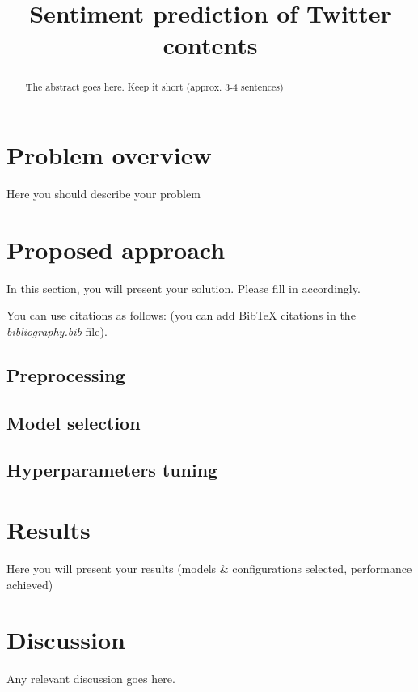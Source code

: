 \documentclass[conference]{IEEEtran}
\begin{document}
\title{Sentiment prediction of Twitter contents}

\author{
}

\maketitle

\begin{abstract}
The abstract goes here. Keep it short (approx. 3-4 sentences)
\end{abstract}

\section{Problem overview}
Here you should describe your problem

\section{Proposed approach}
In this section, you will present your solution. Please fill in accordingly.

You can use citations as follows: \cite{goodfellow2016deep} (you can add BibTeX citations in the \textit{bibliography.bib} file).

\subsection{Preprocessing}
\subsection{Model selection}
\subsection{Hyperparameters tuning}

\section{Results}
Here you will present your results (models \& configurations selected, performance achieved)

\section{Discussion}
Any relevant discussion goes here.



\end{document}
